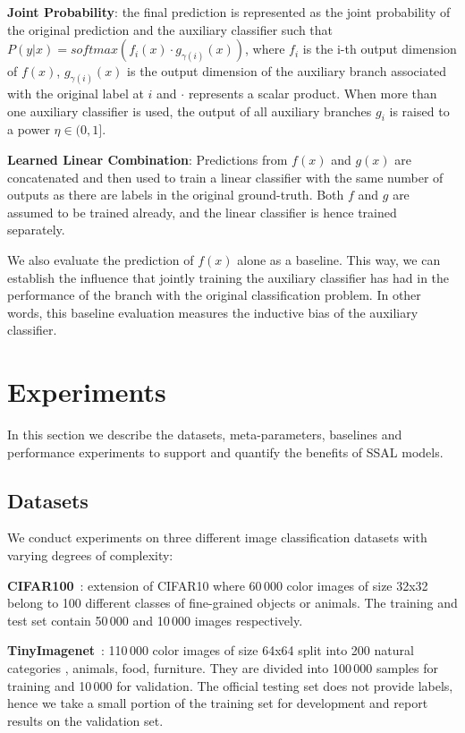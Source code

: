 \documentclass[10pt,twocolumn,letterpaper]{article}
\begin{document}
\textbf{Joint Probability}: the final prediction is represented as the joint probability of the original prediction and the auxiliary classifier such that $P(y|x) = \textit{softmax}(f_i(x) \cdot g_{\gamma(i)}(x))$, where $f_i$ is the i-th output dimension of $f(x)$, $g_{\gamma(i)}(x)$ is the output dimension of the auxiliary branch associated with the original label at $i$ and $\cdot$ represents a scalar product.
When more than one auxiliary classifier is used, the output of all auxiliary branches $g_i$ is raised to a power $\eta \in (0, 1]$.

\textbf{Learned Linear Combination}: Predictions from $f(x)$ and $g(x)$ are concatenated and then used to train a linear classifier with the same number of outputs as there are labels in the original ground-truth.
Both $f$ and $g$ are assumed to be trained already, and the linear classifier is hence trained separately.

We also evaluate the prediction of $f(x)$ alone as a baseline.
This way, we can establish the influence that jointly training the auxiliary classifier has had in the performance of the branch with the original classification problem.
In other words, this baseline evaluation measures the inductive bias of the auxiliary classifier.




\section{Experiments}
\label{sec:experiments}

In this section we describe the datasets, meta-parameters, baselines and performance experiments to support and quantify the benefits of SSAL models.

\subsection{Datasets}
We conduct experiments on three different image classification datasets with varying degrees of complexity:

\textbf{CIFAR100}~\cite{krizhevsky2009learning}: extension of CIFAR10 where 60\,000 color images of size 32x32 belong to 100 different classes of fine-grained objects or animals.
The training and test set contain 50\,000 and 10\,000 images respectively.

\textbf{TinyImagenet}~\cite{tinyimagenet}: 110\,000 color images of size 64x64 split into 200 natural categories \eg, animals, food, furniture.
They are divided into 100\,000 samples for training and 10\,000 for validation.
The official testing set does not provide labels, hence we take a small portion of the training set for development and report results on the validation set.
\end{document}
